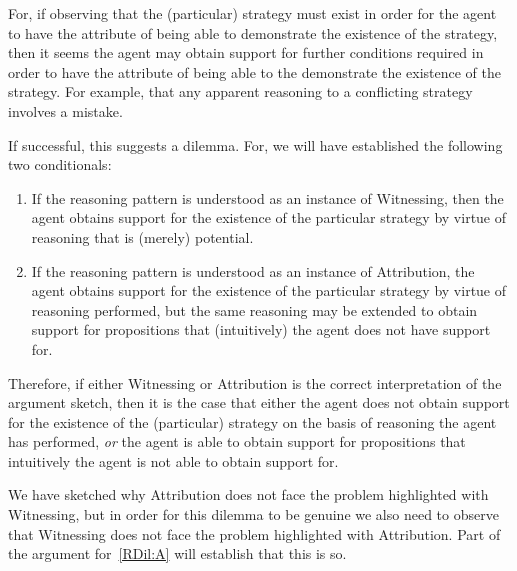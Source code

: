 \documentclass[10pt]{article}
\newcommand{\WR}[0]{\textsf{Witnessing}}
\newcommand{\AR}[0]{\textsf{Attribution}}
\begin{document}
\begin{note}
  For, if observing that the (particular) strategy must exist in order for the agent to have the attribute of being able to demonstrate the existence of the strategy, then it seems the agent may obtain support for further conditions required in order to have the attribute of being able to the demonstrate the existence of the strategy.
  For example, that any apparent reasoning to a conflicting strategy involves a mistake.

  If successful, this suggests a dilemma.
  For, we will have established the following two conditionals:
  \begin{enumerate}[label=(D\arabic*), ref=(D\arabic*)]
  \item\label{RDil:W} If the reasoning pattern is understood as an instance of \WR{}, then the agent obtains support for the existence of the particular strategy by virtue of reasoning that is (merely) potential.
  \item\label{RDil:A} If the reasoning pattern is understood as an instance of \AR{}, the agent obtains support for the existence of the particular strategy by virtue of reasoning performed, but the same reasoning may be extended to obtain support for propositions that (intuitively) the agent does not have support for.
  \end{enumerate}
  Therefore, if either \WR{} or \AR{} is the correct interpretation of the argument sketch, then it is the case that either the agent does not obtain support for the existence of the (particular) strategy on the basis of reasoning the agent has performed, \emph{or} the agent is able to obtain support for propositions that intuitively the agent is not able to obtain support for.

  We have sketched why \AR{} does not face the problem highlighted with \WR{}, but in order for this dilemma to be genuine we also need to observe that \WR{} does not face the problem highlighted with \AR{}.
  Part of the argument for~\ref{RDil:A} will establish that this is so.
\end{note}
\end{document}

